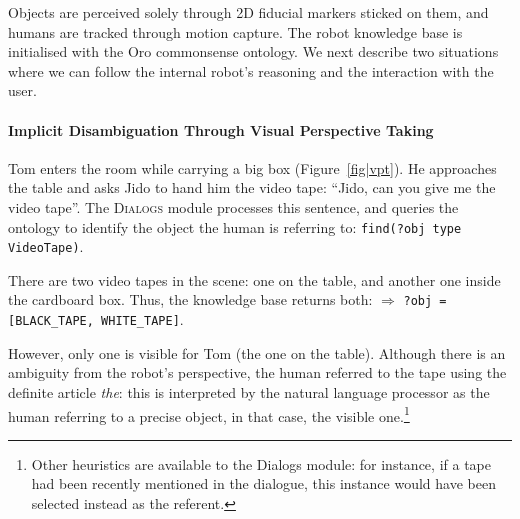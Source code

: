 \documentclass[preprint,3p,times]{elsarticle}
\newcommand{\concept}[1]{{\small \texttt{#1}}}
\begin{document}
Objects are perceived solely through 2D fiducial markers sticked on them, and humans are
tracked through motion capture. The robot knowledge base is initialised with
the {\sc Oro} commonsense ontology.  We next describe two
situations where we can follow the internal robot's reasoning and the
interaction with the user.

\paragraph{Implicit Disambiguation Through Visual Perspective Taking}

\begin{figure}[!ht]
  \centering
\end{figure}


Tom enters the room while carrying a big box (Figure~\ref{fig|vpt}). He
approaches the table and asks Jido to hand him the video tape: ``Jido, can
you give me the video tape''. The \textsc{Dialogs} module processes this
sentence, and queries the ontology to
identify the object the human is referring to: \concept{find(?obj type
VideoTape)}. 

There are two video tapes in the scene: one on the table, and another one
inside the cardboard box. Thus, the knowledge base returns both: $\Rightarrow$
\concept{?obj = [BLACK\_TAPE, WHITE\_TAPE]}. 

However, only one is visible for Tom (the one on the table). Although there is
an ambiguity from the robot's perspective, the human referred to the tape using
the definite article \emph{the}: this is interpreted by the natural language
processor as the human referring to a precise object, in that case, the visible
one.\footnote{Other heuristics are available to the {\sc Dialogs} module: for
instance, if a tape had been recently mentioned in the dialogue, this instance
would have been selected instead as the referent.}
\end{document}
